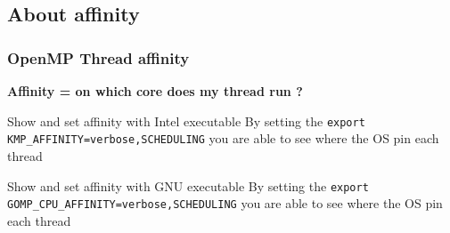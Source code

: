 \subsection{About affinity}


\begin{frame}[fragile]
\frametitle{OpenMP Thread affinity}

\textbf{Affinity = on which core does my thread run ?}

\begin{block}{Show and set affinity with Intel executable}
By setting the \verb+export KMP_AFFINITY=verbose,SCHEDULING+ you are able to see where the OS pin each thread
\end{block}
\begin{block}{Show and set affinity with GNU executable}
By setting the \verb+export GOMP_CPU_AFFINITY=verbose,SCHEDULING+ you are able to see where the OS pin each thread
\end{block}
\end{frame}



